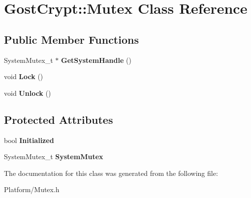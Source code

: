 \hypertarget{class_gost_crypt_1_1_mutex}{}\section{Gost\+Crypt\+:\+:Mutex Class Reference}
\label{class_gost_crypt_1_1_mutex}
\subsection*{Public Member Functions}
\begin{DoxyCompactItemize}
\item 
\mbox{\label{class_gost_crypt_1_1_mutex_abce7509463cef1fe5e8236f254fce224}} 
System\+Mutex\+\_\+t $\ast$ {\bfseries Get\+System\+Handle} ()
\item 
\mbox{\label{class_gost_crypt_1_1_mutex_a1814d75b43d4ab98f3a02687945a0c60}} 
void {\bfseries Lock} ()
\item 
\mbox{\label{class_gost_crypt_1_1_mutex_a33f4da1ab529c34431e85415f9c76b4b}} 
void {\bfseries Unlock} ()
\end{DoxyCompactItemize}
\subsection*{Protected Attributes}
\begin{DoxyCompactItemize}
\item 
\mbox{\label{class_gost_crypt_1_1_mutex_a27e6decc1d7f0822468ec32ab2578176}} 
bool {\bfseries Initialized}
\item 
\mbox{\label{class_gost_crypt_1_1_mutex_a97de995a4340c5c47f30638aa1771792}} 
System\+Mutex\+\_\+t {\bfseries System\+Mutex}
\end{DoxyCompactItemize}


The documentation for this class was generated from the following file\+:\begin{DoxyCompactItemize}
\item 
Platform/Mutex.\+h\end{DoxyCompactItemize}
